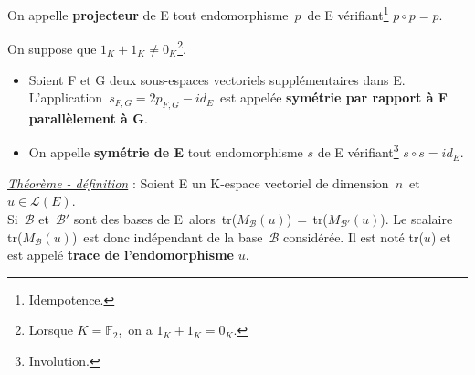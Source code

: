 \vspace{0.5cm}

On appelle \textbf{projecteur} de E tout endomorphisme \(\,p\,\) de E vérifiant\footnote{Idempotence.} \(p\circ p=p\).

\vspace{1.3cm}

\noindent On suppose que \(1_K + 1_K \neq 0_K \)\footnote{Lorsque $K=\mathbb{F}_2$,\, on a $1_K+1_K=0_K$.}.\vspace{-0.1cm}
\begin{itemize}[leftmargin=0.8cm, label=•]
    \item Soient F et G deux sous-espaces vectoriels supplémentaires dans E.\\
    L'application \(\,\displaystyle s_{F,G}=2p_{F,G}-id_E\,\) est appelée \textbf{symétrie par rapport à F parallèlement à G}.\vspace{0.2cm}

    \item On appelle \textbf{symétrie de E} tout endomorphisme \(s\) de E vérifiant\footnote{Involution.} \(s\circ s= id_E\).
\end{itemize}

\vspace{1.3cm}

\underline{\emph{Théorème - définition}} : Soient E un K-espace vectoriel de dimension $\,n\,$ et \(u\in \mathscr{L}(E)\).\vspace{0.1cm}\\
Si \(\,\mathcal{B}\) et \(\,\mathcal{B}'\) sont des bases de E\, alors\, tr(\(M_\mathcal{B}(u)\))$\,=\,$tr(\(M_{\mathcal{B}'}(u)\)). Le scalaire \,tr(\(M_\mathcal{B}(u)\))\, est donc indépendant de la base \(\,\mathcal{B}\) considérée. Il est noté tr($u$) et est appelé \textbf{trace de l'endomorphisme} $u$.

\vspace{1.6cm}

